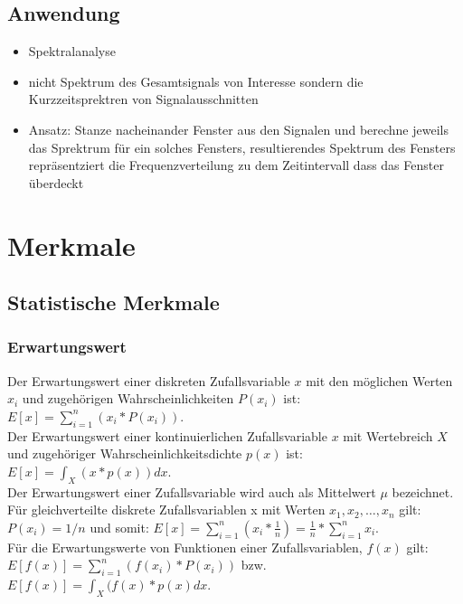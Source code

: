 \documentclass{article} %
\begin{document}
	\subsection{Anwendung}
	\begin{itemize}
		\item Spektralanalyse
		\item nicht Spektrum des Gesamtsignals von Interesse sondern die Kurzzeitsprektren von Signalausschnitten
		\item Ansatz: Stanze nacheinander Fenster aus den Signalen und berechne jeweils das Sprektrum für ein solches Fensters, resultierendes Spektrum des Fensters repräsentziert die Frequenzverteilung zu dem Zeitintervall dass das Fenster überdeckt
	\end{itemize}
\section{Merkmale}
	\subsection{Statistische Merkmale}
		\subsubsection{Erwartungswert}
		Der Erwartungswert einer diskreten Zufallsvariable $x$ mit den möglichen Werten $x_{i}$ und zugehörigen Wahrscheinlichkeiten $P(x_{i})$ ist: $E[x] = \sum_{i=1}^{n} (x_{i}*P(x_i))$.\\
		Der Erwartungswert einer kontinuierlichen Zufallsvariable $x$ mit Wertebreich $X$ und zugehöriger Wahrscheinlichkeitsdichte $p(x)$ ist: $E[x] = \int_{X} (x*p(x)) dx$.\\
		Der Erwartungswert einer Zufallsvariable wird auch als Mittelwert $\mu$ bezeichnet.\\
		Für gleichverteilte diskrete Zufallsvariablen x mit Werten $x_1,x_2,\dots,x_n$ gilt: $P(x_i) = 1/n$ und somit: $E[x] = \sum_{i=1}^{n} (x_{i}*\frac{1}{n}) = \frac{1}{n}*\sum_{i=1}^{n} x_{i}$.\\
		Für die Erwartungswerte von Funktionen einer Zufallsvariablen, $f(x)$ gilt: $E[f(x)]=\sum_{i=1}^{n} (f(x_i)*P(x_i))$ bzw. $E[f(x)] = \int_{X} (f(x)*p(x) dx$.
\end{document}
